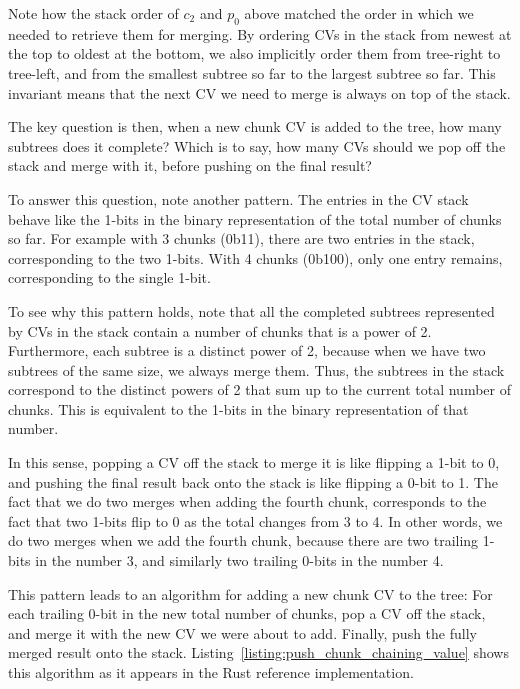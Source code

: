 \documentclass[11pt,notitlepage,a4paper]{article}
\begin{document}
Note how the stack order of $c_2$ and $p_0$ above matched the order in which we
needed to retrieve them for merging. By ordering CVs in the stack from newest
at the top to oldest at the bottom, we also implicitly order them from
tree-right to tree-left, and from the smallest subtree so far to the largest
subtree so far. This invariant means that the next CV we need to merge is
always on top of the stack.

The key question is then, when a new chunk CV is added to the tree, how many
subtrees does it complete? Which is to say, how many CVs should we pop off the
stack and merge with it, before pushing on the final result?

To answer this question, note another pattern. The entries in the CV stack
behave like the 1-bits in the binary representation of the total number of
chunks so far. For example with 3 chunks (0b11), there are two entries in the
stack, corresponding to the two 1-bits. With 4 chunks (0b100), only one entry
remains, corresponding to the single 1-bit.

To see why this pattern holds, note that all the completed subtrees represented
by CVs in the stack contain a number of chunks that is a power of 2.
Furthermore, each subtree is a distinct power of 2, because when we have two
subtrees of the same size, we always merge them. Thus, the subtrees in the
stack correspond to the distinct powers of 2 that sum up to the current total
number of chunks. This is equivalent to the 1-bits in the binary representation
of that number.

In this sense, popping a CV off the stack to merge it is like flipping a 1-bit
to 0, and pushing the final result back onto the stack is like flipping a 0-bit
to 1. The fact that we do two merges when adding the fourth chunk, corresponds
to the fact that two 1-bits flip to 0 as the total changes from 3 to 4. In
other words, we do two merges when we add the fourth chunk, because there are
two trailing 1-bits in the number 3, and similarly two trailing 0-bits in the
number 4.

This pattern leads to an algorithm for adding a new chunk CV to the tree: For
each trailing 0-bit in the new total number of chunks, pop a CV off the stack,
and merge it with the new CV we were about to add. Finally, push the fully
merged result onto the stack. Listing~\ref{listing:push_chunk_chaining_value}
shows this algorithm as it appears in the Rust reference implementation.
\end{document}
